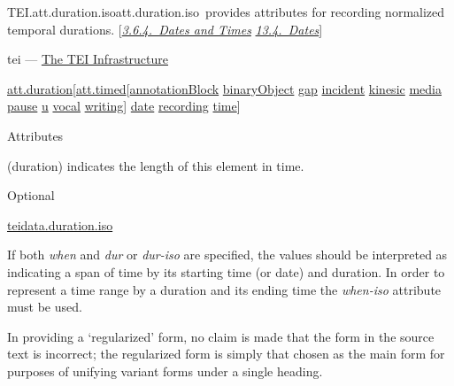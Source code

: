 \begin{reflist}
\item[]\begin{specHead}{TEI.att.duration.iso}{att.duration.iso} provides attributes for recording normalized temporal durations. [\textit{\hyperref[CONADA]{3.6.4.\ Dates and Times}} \textit{\hyperref[NDDATE]{13.4.\ Dates}}]\end{specHead} 
    \item[{Module}]
  tei — \hyperref[ST]{The TEI Infrastructure}
    \item[{Members}]
  \hyperref[TEI.att.duration]{att.duration}[\hyperref[TEI.att.timed]{att.timed}[\hyperref[TEI.annotationBlock]{annotationBlock} \hyperref[TEI.binaryObject]{binaryObject} \hyperref[TEI.gap]{gap} \hyperref[TEI.incident]{incident} \hyperref[TEI.kinesic]{kinesic} \hyperref[TEI.media]{media} \hyperref[TEI.pause]{pause} \hyperref[TEI.u]{u} \hyperref[TEI.vocal]{vocal} \hyperref[TEI.writing]{writing}] \hyperref[TEI.date]{date} \hyperref[TEI.recording]{recording} \hyperref[TEI.time]{time}]
    \item[{Attributes}]
  Attributes\hfil\\[-10pt]\begin{sansreflist}
    \item[@dur-iso]
  (duration) indicates the length of this element in time.
\begin{reflist}
    \item[{Status}]
  Optional
    \item[{Datatype}]
  \hyperref[TEI.teidata.duration.iso]{teidata.duration.iso}
\end{reflist}  
\end{sansreflist}  
    \item[{Note}]
  \par
If both {\itshape when} and {\itshape dur} or {\itshape dur-iso} are specified, the values should be interpreted as indicating a span of time by its starting time (or date) and duration. In order to represent a time range by a duration and its ending time the {\itshape when-iso} attribute must be used.\par
In providing a ‘regularized’ form, no claim is made that the form in the source text is incorrect; the regularized form is simply that chosen as the main form for purposes of unifying variant forms under a single heading.
\end{reflist}  
